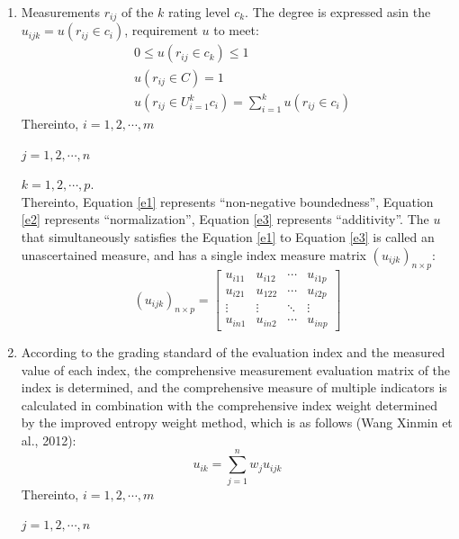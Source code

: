 \documentclass[12pt]{article}  %
\begin{document}
\begin{enumerate}
    \renewcommand{\labelenumi}{\textbf{Step \theenumi}}
    \item Measurements $r_{ij}$ of the $k$ rating level $c_k$. The degree is expressed asin the $u_{ijk}=u(r_{ij}\in c_i)$, requirement $u$ to meet:
\begin{eqnarray}
    &0\le u(r_{ij}\in c_k)\le 1
    \label{e1}\\
    &u(r_{ij}\in C)=1
    \label{e2}\\
    &u(r_{ij}\in U_{i=1}^kc_i)=\sum_{i=1}^{k}u(r_{ij}\in c_i)\label{e3}
\end{eqnarray}
Thereinto, $i=1,2,\cdots ,m$

\hspace{4.5em}$j=1,2,\cdots ,n$

\hspace{4.5em}$k=1,2,\cdots ,p$.\\
Thereinto, Equation \ref{e1} represents ``non-negative boundedness'', Equation \ref{e2} represents ``normalization'', Equation \ref{e3} represents ``additivity''. The $u$ that simultaneously satisfies the Equation \ref{e1} to Equation \ref{e3} is called an unascertained measure, and has a single index measure matrix $(u_{ijk})_{n\times p}$:
\begin{equation}
    (u_{ijk})_{n\times p}=\begin{bmatrix}
  u_{i11}&u_{i12}  &\cdots  &u_{i1p} \\
 u_{i21} &u_{122}  &\cdots  &u_{i2p} \\
\vdots  & \vdots   & \ddots &\vdots  \\
  u_{in1}&u_{in2}  &\cdots  &u_{inp}
\end{bmatrix}
\end{equation}
\item According to the grading standard of the evaluation index and the measured value of each index, the comprehensive measurement evaluation matrix of the index is determined, and the comprehensive measure of multiple indicators is calculated in combination with the comprehensive index weight determined by the improved entropy weight method, which is as follows (Wang Xinmin et al., 2012):
\begin{equation}
    u_{ik}=\sum_{j=1}^{n}w_ju_{ijk}
\end{equation}
Thereinto, $i=1,2,\cdots ,m$

\hspace{4.5em}$j=1,2,\cdots ,n$


\end{enumerate}
\end{document}
